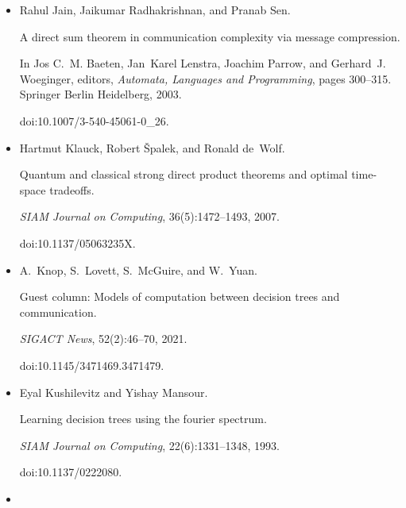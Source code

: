 \documentclass[10pt,a4paper]{article}
\begin{document}
\begin{itemize}
\emph{Information Processing Letters}, 110(20):893–897, 2010.


doi:10.1016/j.ipl.2010.07.020.





\item[] 
[37]

Rahul Jain, Jaikumar Radhakrishnan, and Pranab Sen.


A direct sum theorem in communication complexity via message
compression.


In Jos C. M. Baeten, Jan Karel Lenstra, Joachim Parrow, and
Gerhard J. Woeginger, editors, \emph{Automata, Languages and Programming},
pages 300–315. Springer Berlin Heidelberg, 2003.


doi:10.1007/3-540-45061-0\_26.





\item[] 
[38]

Hartmut Klauck, Robert Špalek, and Ronald de Wolf.


Quantum and classical strong direct product theorems and optimal
time-space tradeoffs.


\emph{SIAM Journal on Computing}, 36(5):1472–1493, 2007.


doi:10.1137/05063235X.





\item[] 
[39]

A. Knop, S. Lovett, S. McGuire, and W. Yuan.


Guest column: Models of computation between decision trees and
communication.


\emph{SIGACT News}, 52(2):46–70, 2021.


doi:10.1145/3471469.3471479.





\item[] 
[40]

Eyal Kushilevitz and Yishay Mansour.


Learning decision trees using the fourier spectrum.


\emph{SIAM Journal on Computing}, 22(6):1331–1348, 1993.


doi:10.1137/0222080.





\item[] 
[41]


\end{itemize}
\end{document}
